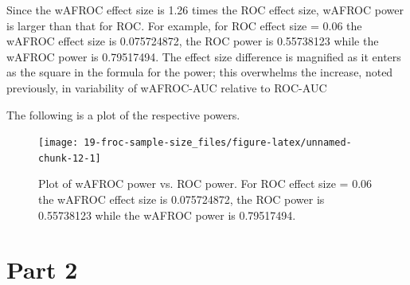 \documentclass[
]{book}
\newenvironment{Shaded}{\begin{snugshade}}{\end{snugshade}}
\newcommand{\AttributeTok}[1]{\textcolor[rgb]{0.77,0.63,0.00}{#1}}
\newcommand{\CommentTok}[1]{\textcolor[rgb]{0.56,0.35,0.01}{\textit{#1}}}
\newcommand{\ConstantTok}[1]{\textcolor[rgb]{0.00,0.00,0.00}{#1}}
\newcommand{\FunctionTok}[1]{\textcolor[rgb]{0.00,0.00,0.00}{#1}}
\newcommand{\NormalTok}[1]{#1}
\newcommand{\OtherTok}[1]{\textcolor[rgb]{0.56,0.35,0.01}{#1}}
\newcommand{\SpecialCharTok}[1]{\textcolor[rgb]{0.00,0.00,0.00}{#1}}
\newcommand{\StringTok}[1]{\textcolor[rgb]{0.31,0.60,0.02}{#1}}
\begin{document}
\begin{Shaded}
\end{Shaded}

Since the wAFROC effect size is 1.26 times the ROC effect size, wAFROC power is larger than that for ROC. For example, for ROC effect size = 0.06 the wAFROC effect size is 0.075724872, the ROC power is 0.55738123 while the wAFROC power is 0.79517494. The effect size difference is magnified as it enters as the square in the formula for the power; this overwhelms the increase, noted previously, in variability of wAFROC-AUC relative to ROC-AUC

The following is a plot of the respective powers.

\begin{figure}

{\centering \texttt{[image: 19-froc-sample-size\_files/figure-latex/unnamed-chunk-12-1]} 

}

\caption{Plot of wAFROC power vs. ROC power. For ROC effect size = 0.06 the wAFROC effect size is 0.075724872, the ROC power is 0.55738123 while the wAFROC power is 0.79517494.}\label{fig:unnamed-chunk-12}
\end{figure}

\hypertarget{part-2}{%
\section{Part 2}\label{part-2}}
\end{document}
